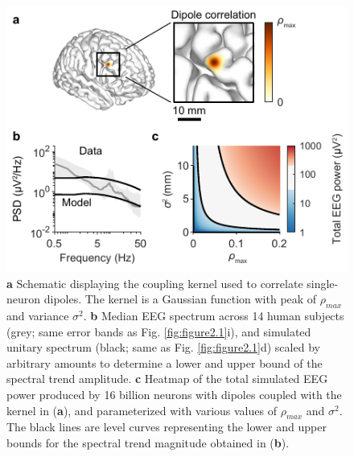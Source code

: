 \begin{figure}
  \begin{minipage}[c]{77mm}
    \includegraphics[width=\textwidth]{Figures/chapter2/figure2.pdf}
  \end{minipage}\hfill
  \begin{minipage}[c]{77mm}
    \caption{
	\textbf{a} Schematic displaying the coupling kernel used to correlate single-neuron dipoles. The kernel is a Gaussian function with peak of $\rho_{max}$ and variance $\sigma^2$.
	\textbf{b} Median EEG spectrum across 14 human subjects (grey; same error bands as Fig. \ref{fig:figure2.1}i), and simulated unitary spectrum (black; same as Fig. \ref{fig:figure2.1}d) scaled by arbitrary amounts to determine a lower and upper bound of the spectral trend amplitude. 
	\textbf{c} Heatmap of the total simulated EEG power produced by 16 billion neurons with dipoles coupled with the kernel in (\textbf{a}), and parameterized with various values of $\rho_{max}$ and $\sigma^2$. The black lines are level curves representing the lower and upper bounds for the spectral trend magnitude obtained in (\textbf{b}).
    } \label{fig:figure2.2}
  \end{minipage}
\end{figure}


